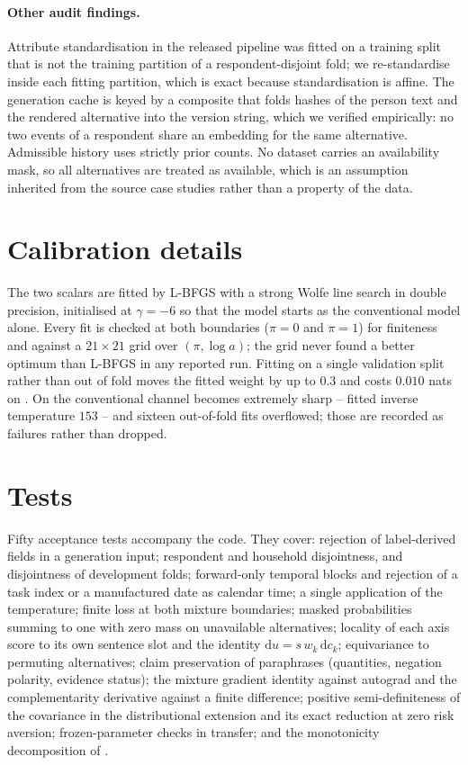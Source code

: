 \paragraph{Other audit findings.} Attribute standardisation in the released pipeline was fitted on
a training split that is not the training partition of a respondent-disjoint fold; we
re-standardise inside each fitting partition, which is exact because standardisation is affine.
The generation cache is keyed by a composite that folds hashes of the person text and the rendered
alternative into the version string, which we verified empirically: no two events of a respondent
share an embedding for the same alternative. Admissible history uses strictly prior counts. No
dataset carries an availability mask, so all alternatives are treated as available, which is an
assumption inherited from the source case studies rather than a property of the data.

\section{Calibration details}
\label{app:calibration}

The two scalars are fitted by L-BFGS with a strong Wolfe line search in double precision,
initialised at $\gamma = -6$ so that the model starts as the conventional model alone. Every fit
is checked at both boundaries ($\pi = 0$ and $\pi = 1$) for finiteness and against a
$21 \times 21$ grid over $(\pi, \log a)$; the grid never found a better optimum than L-BFGS in any
reported run. Fitting on a single validation split rather than out of fold moves the fitted weight
by up to $0.3$ and costs $0.010$ nats on . On  the conventional
channel becomes extremely sharp -- fitted inverse temperature $153$ -- and sixteen out-of-fold
fits overflowed; those are recorded as failures rather than dropped.

\section{Tests}
\label{app:tests}

Fifty acceptance tests accompany the code. They cover: rejection of label-derived fields in a
generation input; respondent and household disjointness, and disjointness of development folds;
forward-only temporal blocks and rejection of a task index or a manufactured date as calendar
time; a single application of the temperature; finite loss at both mixture boundaries; masked
probabilities summing to one with zero mass on unavailable alternatives; locality of each axis
score to its own sentence slot and the identity $\mathrm{d}u = s\,w_k\,\mathrm{d}c_k$; equivariance
to permuting alternatives; claim preservation of paraphrases (quantities, negation polarity,
evidence status); the mixture gradient identity against autograd and the complementarity
derivative against a finite difference; positive semi-definiteness of the covariance in the
distributional extension and its exact reduction at zero risk aversion; frozen-parameter checks in
transfer; and the monotonicity decomposition of .

